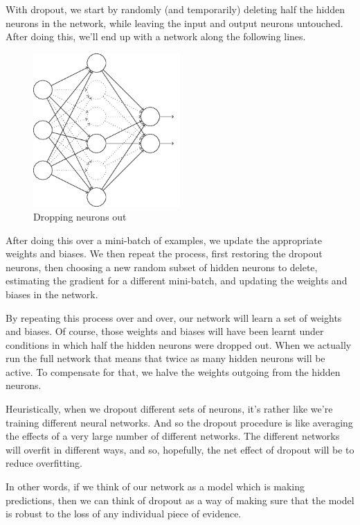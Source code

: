 \documentclass[12 pt]{article}
\begin{document}
With dropout, we start by randomly (and temporarily) deleting half the
hidden neurons in the network, while leaving the input and output
neurons untouched. After doing this, we'll end up with a network along
the following lines.

\begin{figure}[htp]
\centering
\includegraphics[width=0.5\textwidth]{./figs/tikz31.png}
\caption{Dropping neurons out}
\end{figure}

After doing this over a mini-batch of examples, we update the
appropriate weights and biases. We then repeat the process, first
restoring the dropout neurons, then choosing a new random subset of
hidden neurons to delete, estimating the gradient for a different
mini-batch, and updating the weights and biases in the network.

By repeating this process over and over, our network will learn a set of
weights and biases. Of course, those weights and biases will have been
learnt under conditions in which half the hidden neurons were dropped
out. When we actually run the full network that means that twice as many
hidden neurons will be active. To compensate for that, we halve the
weights outgoing from the hidden neurons.

Heuristically, when we dropout different sets of neurons, it's rather
like we're training different neural networks. And so the dropout
procedure is like averaging the effects of a very large number of
different networks. The different networks will overfit in different
ways, and so, hopefully, the net effect of dropout will be to reduce
overfitting.

In other words, if we think of our network as a model which is making
predictions, then we can think of dropout as a way of making sure that
the model is robust to the loss of any individual piece of evidence.
\end{document}
